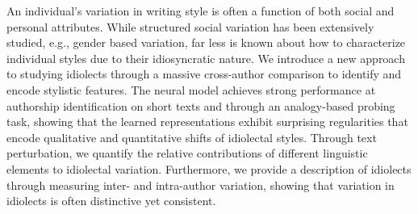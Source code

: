 An individual's variation in writing style is often a function of both social and personal attributes. While structured social variation has been extensively studied, e.g., gender based variation, far less is known about how to characterize individual styles due to their idiosyncratic nature. We introduce a new approach to studying idiolects through a massive cross-author comparison to identify and encode stylistic features. The neural model achieves strong performance at authorship identification on short texts and through an analogy-based probing task, showing that the learned representations exhibit surprising regularities that encode qualitative and quantitative shifts of idiolectal styles. Through text perturbation, we quantify the relative contributions of different linguistic elements to idiolectal variation. Furthermore, we provide a description of idiolects through measuring inter- and intra-author variation, showing that variation in idiolects is often distinctive yet consistent.
